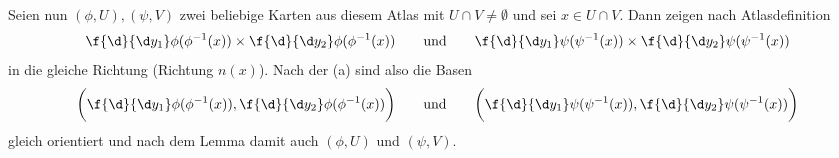 \documentclass{mywork}
\begin{document}
\begin{aufgabe}
\begin{enumerate}[(a)]
\begin{seg}[„$\Longleftarrow$“]
				Seien nun $(\phi, U), (\psi, V)$ zwei beliebige Karten aus diesem Atlas mit $U\cap V \neq \emptyset$ und sei $x\in U\cap V$.
				Dann zeigen nach Atlasdefinition
				\[
					\f{\d}{\d y_1}\phi(\phi^{-1}(x)) \times \f{\d}{\d y_2} \phi(\phi^{-1}(x))
					\qquad\text{und}\qquad
					\f{\d}{\d y_1}\psi(\psi^{-1}(x)) \times \f{\d}{\d y_2} \psi(\psi^{-1}(x))
				\]
				in die gleiche Richtung (Richtung $n(x)$).
				Nach der (a) sind also die Basen
				\[
					\bigg( \f{\d}{\d y_1} \phi(\phi^{-1}(x)), \f{\d}{\d y_2} \phi(\phi^{-1}(x)) \bigg)
					\qquad \text{und}\qquad
					\bigg( \f{\d}{\d y_1} \psi(\psi^{-1}(x)), \f{\d}{\d y_2} \psi(\psi^{-1}(x)) \bigg)
				\]
				gleich orientiert und nach dem Lemma damit auch $(\phi, U)$ und $(\psi, V)$.
			\end{seg}
	\end{enumerate}
\end{aufgabe}
\end{document}
